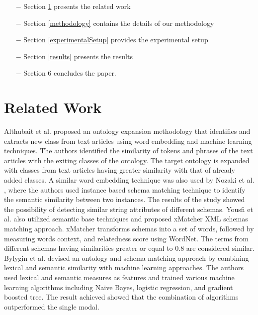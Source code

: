 \documentclass{ieeeaccess}
\begin{document}
\begin{itemize}
	\item[$-$] Section \ref{relatedwork} presents the related work
	\item[$-$] Section \ref{methodology} contains the details of our methodology
	\item[$-$] Section \ref{experimentalSetup} provides the experimental setup
	\item[$-$] Section \ref{results} presents the results
	\item[$-$] Section 6 concludes the paper.
\end{itemize}



\section{Related Work}
\label{relatedwork}
Althubait et al. \cite{althubaiti2020combining} proposed an ontology expansion methodology that identifies and extracts new class from text articles using word embedding and machine learning techniques. The authors identified the similarity of tokens and phrases of the text articles with the exiting classes of the ontology. The target ontology is expanded with classes from text articles having greater similarity with that of already added classes. A similar word embedding technique was also used by Nozaki et al. \cite{nozaki2019semantic}, where the authors used instance based schema matching technique to identify the semantic similarity between two instances. The results of the study showed the possibility of detecting similar string attributes of different schemas. Yousfi et al. \cite{yousfi2020xmatcher} also utilized semantic base techniques and proposed xMatcher XML schemas matching approach. xMatcher transforms schemas into a set of words, followed by measuring words context, and relatedness score using WordNet. The terms from different schemas having similarities greater or equal to 0.8 are considered similar. 
Bylygin et al. \cite{bulygin2018combining} devised an ontology and schema matching approach by combining lexical and semantic similarity with machine learning approaches.  The authors used lexical and semantic measures as features and trained various machine learning algorithms including Naive Bayes, logistic regression, and gradient boosted tree. The result achieved showed that the combination of algorithms outperformed the single modal.
\end{document}

